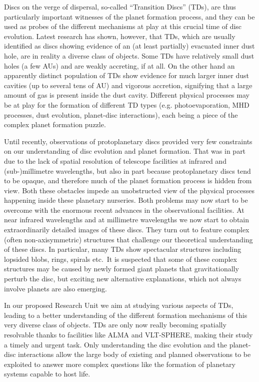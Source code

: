\documentclass[12pt]{article}
\begin{document}
Discs on the verge of dispersal, so-called ``Transition Discs'' (TDs),  are thus particularly important
witnesses of the planet formation process, and they can be used
as probes of the different mechanisms at play at this crucial time of
disc evolution. Latest research has shown, however, that TDs, which are usually
identified as discs showing evidence of an (at least partially)
evacuated inner dust hole, are in reality a diverse class of
objects. Some TDs have relatively small dust holes (a few AUs) and are
weakly accreting, if at all. On the other hand an apparently distinct
population of TDs show evidence for much larger inner dust cavities
(up to several tens of AU) and vigorous accretion, signifying that a
large amount of gas is present inside the dust cavity. Different
physical processes may be at play for the formation of different TD
types (e.g. photoevaporation, MHD processes, dust evolution, planet-disc interactions),
each being a piece of the complex planet formation puzzle. 

Until recently, observations of protoplanetary discs provided very few
constraints on our understanding of disc evolution and planet formation. That was in part due
to the lack of spatial resolution of telescope facilities at infrared and
(sub-)millimetre wavelengths, but also in part because protoplanetary discs
tend to be opaque, and therefore much of the planet formation process is
hidden from view. Both these obstacles impede an unobstructed view of the
physical processes happening inside these planetary nurseries. Both problems may now start to
be overcome with the enormous recent advances in the observational
facilities. At near infrared wavelengths and at millimetre wavelengths we
now start to obtain extraordinarily detailed images of these discs. They
turn out to feature complex (often non-axisymmetric) structures that
challenge our theoretical understanding of these discs. In particular,
many TDs show spectacular structures including lopsided blobs, rings,
spirals etc.\ It is suspected 
that some of these complex structures may be caused by newly formed giant
planets that gravitationally perturb the disc, but exciting new
alternative explanations, which not always involve planets are also emerging. 

In our proposed Research Unit we aim at studying various aspects of
TDs, leading to a better understanding of the different formation
mechanisms of this very diverse class of objects. TDs are
only now really becoming spatially resolvable thanks
to facilities like ALMA and VLT-SPHERE, making their study a timely and
urgent task. Only understanding the disc evolution and the planet-disc
interactions allow the large body of existing and planned observations to be
exploited to answer more complex questions like the formation of planetary
systems capable to host life.
\end{document}
